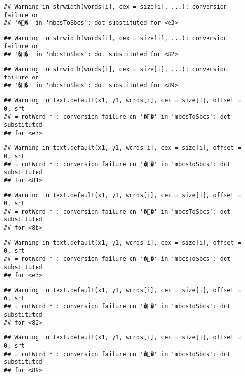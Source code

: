 \documentclass[]{article}
\begin{document}
\begin{verbatim}
## Warning in strwidth(words[i], cex = size[i], ...): conversion failure on
## '��' in 'mbcsToSbcs': dot substituted for <e3>
\end{verbatim}

\begin{verbatim}
## Warning in strwidth(words[i], cex = size[i], ...): conversion failure on
## '��' in 'mbcsToSbcs': dot substituted for <82>
\end{verbatim}

\begin{verbatim}
## Warning in strwidth(words[i], cex = size[i], ...): conversion failure on
## '��' in 'mbcsToSbcs': dot substituted for <89>
\end{verbatim}

\begin{verbatim}
## Warning in text.default(x1, y1, words[i], cex = size[i], offset = 0, srt
## = rotWord * : conversion failure on '��' in 'mbcsToSbcs': dot substituted
## for <e3>
\end{verbatim}

\begin{verbatim}
## Warning in text.default(x1, y1, words[i], cex = size[i], offset = 0, srt
## = rotWord * : conversion failure on '��' in 'mbcsToSbcs': dot substituted
## for <81>
\end{verbatim}

\begin{verbatim}
## Warning in text.default(x1, y1, words[i], cex = size[i], offset = 0, srt
## = rotWord * : conversion failure on '��' in 'mbcsToSbcs': dot substituted
## for <8b>
\end{verbatim}

\begin{verbatim}
## Warning in text.default(x1, y1, words[i], cex = size[i], offset = 0, srt
## = rotWord * : conversion failure on '��' in 'mbcsToSbcs': dot substituted
## for <e3>
\end{verbatim}

\begin{verbatim}
## Warning in text.default(x1, y1, words[i], cex = size[i], offset = 0, srt
## = rotWord * : conversion failure on '��' in 'mbcsToSbcs': dot substituted
## for <82>
\end{verbatim}

\begin{verbatim}
## Warning in text.default(x1, y1, words[i], cex = size[i], offset = 0, srt
## = rotWord * : conversion failure on '��' in 'mbcsToSbcs': dot substituted
## for <89>
\end{verbatim}
\end{document}
